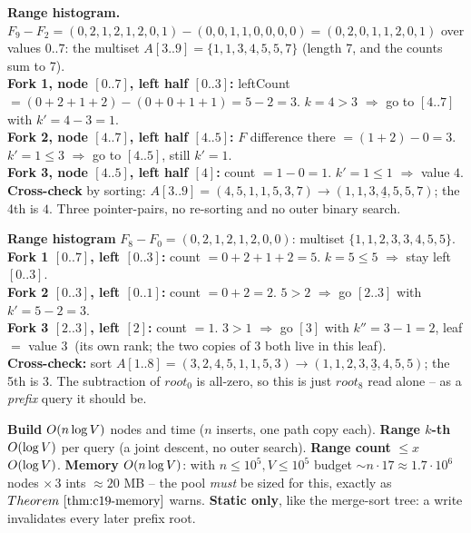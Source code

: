 \begin{tracebox}
\textbf{Range histogram.} \(F_9-F_2=(0,2,1,2,1,2,0,1)-(0,0,1,1,0,0,0,0)=(0,2,0,1,1,2,0,1)\) over values \(0..7\): the multiset \(A[3..9]=\{1,1,3,4,5,5,7\}\) (length 7, and the counts sum to 7).\\
\textbf{Fork 1, node \([0..7]\), left half \([0..3]\):} leftCount \(=(0+2+1+2)-(0+0+1+1)=5-2=3\).  \(k=4>3\) \(\Rightarrow\) go to \([4..7]\) with \(k'=4-3=1\).\\
\textbf{Fork 2, node \([4..7]\), left half \([4..5]\):} \(F\) difference there \(=(1+2)-0=3\).  \(k'=1\le3\) \(\Rightarrow\) go to \([4..5]\), still \(k'=1\).\\
\textbf{Fork 3, node \([4..5]\), left half \([4]\):} count \(=1-0=1\).  \(k'=1\le1\) \(\Rightarrow\) value \(\boxed{4}\).\\
\textbf{Cross-check} by sorting: \(A[3..9]=(4,5,1,1,5,3,7)\to(1,1,3,\underline{4},5,5,7)\); the 4th is \(4\).  Three pointer-pairs, no re-sorting and no outer binary search.
\end{tracebox}

\begin{tracebox}[kth(1..8, k=5) = 3, a second two-root walk on the same chain]
\textbf{Range histogram} \(F_8-F_0=(0,2,1,2,1,2,0,0)\): multiset \(\{1,1,2,3,3,4,5,5\}\).\\
\textbf{Fork 1 \([0..7]\), left \([0..3]\):} count \(=0+2+1+2=5\).  \(k=5\le5\) \(\Rightarrow\) stay left \([0..3]\).\\
\textbf{Fork 2 \([0..3]\), left \([0..1]\):} count \(=0+2=2\).  \(5>2\) \(\Rightarrow\) go \([2..3]\) with \(k'=5-2=3\).\\
\textbf{Fork 3 \([2..3]\), left \([2]\):} count \(=1\).  \(3>1\) \(\Rightarrow\) go \([3]\) with \(k''=3-1=2\), leaf \(=\) value \(\boxed{3\ }\) (its own rank; the two copies of \(3\) both live in this leaf).\\
\textbf{Cross-check:} sort \(A[1..8]=(3,2,4,5,1,1,5,3)\to(1,1,2,3,\underline{3},4,5,5)\); the 5th is \(3\).  The subtraction of \(\mathit{root}_0\) is all-zero, so this is just \(\mathit{root}_8\) read alone -- as a \emph{prefix} query it should be.
\end{tracebox}

\begin{complexitybox}
\textbf{Build} \(O(n\log V)\) nodes and time (\(n\) inserts, one path copy each). \textbf{Range \(k\)-th} \(O(\log V)\) per query (a joint descent, no outer search). \textbf{Range count} \(\le x\) \(O(\log V)\). \textbf{Memory} \(O(n\log V)\): with \(n\le10^5,V\le10^5\) budget \(\sim n\cdot 17\approx1.7\cdot10^6\) nodes \(\times\,3\) ints \(\approx 20\) MB -- the pool \emph{must} be sized for this, exactly as \(\thmref{c19-memory}\) warns. \textbf{Static only}, like the merge-sort tree: a write invalidates every later prefix root.
\end{complexitybox}

